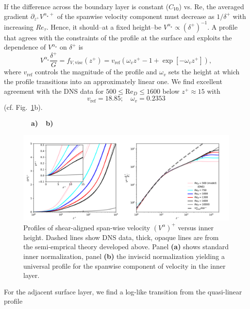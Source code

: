 \documentclass[smallcondensed,final]{svjour3}
\newcommand{\RE}{\mathrm{Re}}
\begin{document}
If the difference across the boundary layer is constant ($C_{V0}$) vs. $\RE$,
the averaged gradient $\partial_{z^+} V^{\alpha_\star+}$ of the spanwise velocity component
must decrease as $1/\delta^+$ with increasing $Re_\tau$. 
%
Hence, it should--at a fixed height--be $V^{\alpha_\star} \propto \left(\delta^{+}\right)^{-1}$.
%
A profile that agrees with the constraints of the profile at the surface
and exploits the dependence of $V^{\alpha_\star}$ on $\delta^+$ is 
\begin{equation}
  V^{\alpha_\star}\frac{\delta^+}{G} = f_{V,\mathrm{visc}}(z^+) = v_\mathrm{ref} \left( \omega_v z^+ -1 + \exp[-\omega_v z^+]\right),
  \label{eqn:scaling_spanwise} 
\end{equation}
where $v_\mathrm{ref}$ controls the magnitude of the profile and $\omega_v$ sets the height at which the profile
transitions into an approximately linear one.
%
We find excellent agreement with the DNS data for $500\le\RE_D\le1600$ below $z^+\approx 15$ with
\[v_\mathrm{ref} = 18.85;  \quad \omega_v=0.2353\]
(cf. Fig.~\ref{fig:inner_w}b). 
%
\begin{figure}
  \begin{flushleft}
    \textbf{\ \ a)}\hspace{0.45\textwidth}\textbf{\ \ b)}\\
  \end{flushleft} 
  \includegraphics[width=1.0\textwidth]{../plot/w_profile.pdf}
  \caption{Profiles of shear-aligned span-wise velocity $(V^\alpha)^+$ versus inner height. 
    Dashed lines show DNS data, thick, opaque lines are from the semi-emprical theory developed above.
    Panel \textbf{(a)} shows standard inner normalization, panel \textbf{(b)} the inviscid normalization yielding
    a universal profile for the spanwise component of velocity in the inner layer. }
  \label{fig:inner_w}
\end{figure}
\par
%
For the adjacent surface layer, we find a log-like transition from the quasi-linear profile
\end{document}
